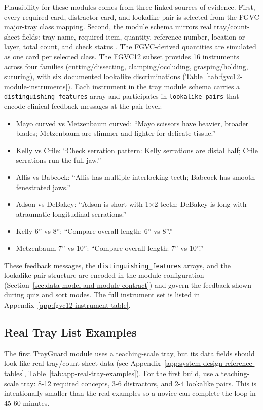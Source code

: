 \documentclass[10pt,a4paper]{article}
\begin{document}
Plausibility for these modules comes from three linked sources of evidence.
First, every required card, distractor card, and lookalike pair is selected from
the FGVC major-tray class mapping. Second, the module schema mirrors real
tray/count-sheet fields: tray name, required item, quantity, reference number,
location or layer, total count, and check status
\cite{stryker-gamma4-count-sheet-2023, stryker-imn-count-sheet-2023}. The FGVC-derived quantities are simulated
as one card per selected class. The FGVC12 subset provides 16 instruments
across four families (cutting/dissecting, clamping/occluding, grasping/holding,
suturing), with six documented lookalike discriminations
(Table~\ref{tab:fgvc12-module-instruments}). Each instrument in the tray module
schema carries a \texttt{distinguishing\_features} array and participates in
\texttt{lookalike\_pairs} that encode clinical feedback messages at the pair
level:
\begin{itemize}
  \item Mayo curved vs Metzenbaum curved: ``Mayo scissors have heavier, broader blades; Metzenbaum are slimmer and lighter for delicate tissue.''
  \item Kelly vs Crile: ``Check serration pattern: Kelly serrations are distal half; Crile serrations run the full jaw.''
  \item Allis vs Babcock: ``Allis has multiple interlocking teeth; Babcock has smooth fenestrated jaws.''
  \item Adson vs DeBakey: ``Adson is short with 1$\times$2 teeth; DeBakey is long with atraumatic longitudinal serrations.''
  \item Kelly 6'' vs 8'': ``Compare overall length: 6'' vs 8''.''
  \item Metzenbaum 7'' vs 10'': ``Compare overall length: 7'' vs 10''.''
\end{itemize}
These feedback messages, the \texttt{distinguishing\_features} arrays, and the
lookalike pair structure are encoded in the module configuration
(Section~\ref{sec:data-model-and-module-contract}) and govern the feedback shown
during quiz and sort modes. The full instrument set is listed in
Appendix~\ref{app:fgvc12-instrument-table}.
\subsection{Real Tray List Examples}
\label{sec:real-tray-list-examples}

The first TrayGuard module uses a teaching-scale tray, but its data
fields should look like real tray/count-sheet data (see Appendix~\ref{app:system-design-reference-tables}, Table~\ref{tab:app-real-tray-examples}).
For the first build, use a teaching-scale tray: 8-12 required concepts, 3-6
distractors, and 2-4 lookalike pairs. This is intentionally smaller than the
real examples so a novice can complete the loop in 45-60 minutes.
\end{document}
